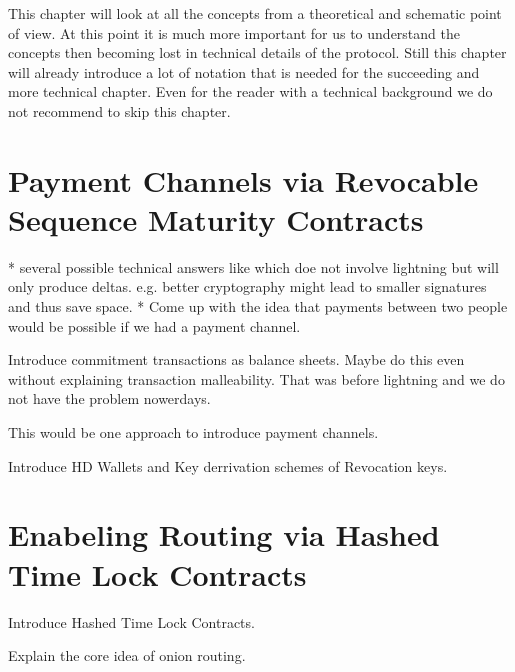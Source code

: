 \documentclass[a4paper,12pt,oneside,openany]{book}
\begin{document}
This chapter will look at all the concepts from a theoretical and schematic point of view.
At this point it is much more important for us to understand the concepts then becoming lost in technical details of the protocol.
Still this chapter will already introduce a lot of notation that is needed for the succeeding and more technical chapter.
Even for the reader with a technical background we do not recommend to skip this chapter.

\section{Payment Channels via Revocable Sequence Maturity Contracts}


* several possible technical answers like which doe not involve lightning but will only produce deltas. e.g. better cryptography might lead to smaller signatures and thus save space.
* Come up with the idea that payments between two people would be possible if we had a payment channel.


Introduce commitment transactions as balance sheets.
Maybe do this even without explaining transaction malleability. That was before lightning and we do not have the problem nowerdays.

This would be one approach to introduce payment channels.

Introduce HD Wallets and Key derrivation schemes of Revocation keys.

\section{Enabeling Routing via Hashed Time Lock Contracts}
Introduce Hashed Time Lock Contracts.

Explain the core idea of onion routing.
\end{document}
